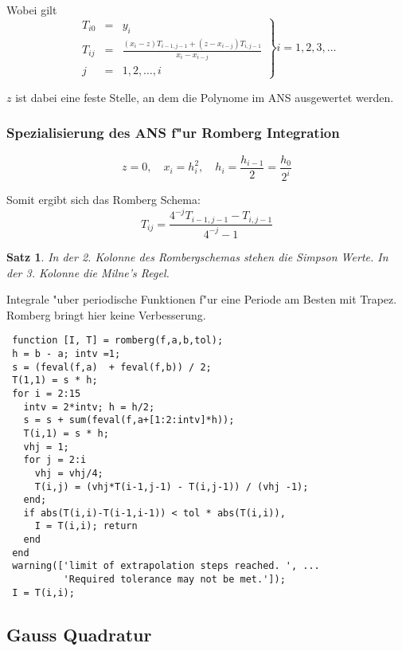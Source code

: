 \documentclass[german, 10pt, a4paper, twocolumn]{scrartcl}
\newtheorem{satz}{Satz}[section]
\theoremstyle{definition}
\begin{document}
Wobei gilt 
\begin{displaymath}
	\left .
	\begin{array}{lcl}
		T_{i0} &	= &	y_i\\
		T_{ij} &	= &	\frac{(x_i - z)T_{i-1,j-1}+(z-x_{i-j})T_{i,j-1}}{x_i - x_{i-j}}\\
		j &		= &	1,2,\ldots, i
	\end{array}
	\right \} i = 1,2,3,\ldots
\end{displaymath}

$z$ ist dabei eine feste Stelle, an dem die Polynome im ANS ausgewertet werden.

\subsubsection{Spezialisierung des ANS f"ur Romberg Integration}

\begin{displaymath}
	z = 0, \quad x_i = h_i^2, \quad h_i = \frac{h_{i-1}}{2} = \frac{h_0}{2^i}
\end{displaymath}

Somit ergibt sich das Romberg Schema:
\begin{displaymath}
	T_{ij} = \frac{4^{-j}T_{i-1,j-1} - T_{i,j-1}}{4^{-j}-1}
\end{displaymath}

\begin{satz}
	In der 2. Kolonne des Rombergschemas stehen die Simpson Werte. In der 3. Kolonne die Milne's Regel.
\end{satz}

Integrale "uber periodische Funktionen f"ur eine Periode am Besten mit Trapez. Romberg bringt hier keine Verbesserung.

\small
\begin{verbatim}
 function [I, T] = romberg(f,a,b,tol);
 h = b - a; intv =1;
 s = (feval(f,a)  + feval(f,b)) / 2;
 T(1,1) = s * h;
 for i = 2:15
   intv = 2*intv; h = h/2;
   s = s + sum(feval(f,a+[1:2:intv]*h));
   T(i,1) = s * h;
   vhj = 1;
   for j = 2:i
     vhj = vhj/4;
     T(i,j) = (vhj*T(i-1,j-1) - T(i,j-1)) / (vhj -1);
   end;
   if abs(T(i,i)-T(i-1,i-1)) < tol * abs(T(i,i)),
     I = T(i,i); return
   end
 end
 warning(['limit of extrapolation steps reached. ', ...
          'Required tolerance may not be met.']);
 I = T(i,i);
\end{verbatim}
\normalsize

\subsection{Gauss Quadratur}
\end{document}
